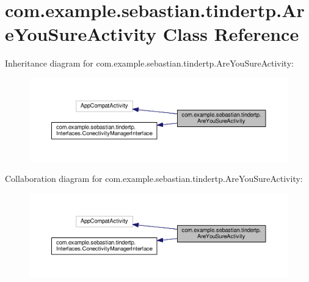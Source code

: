 \hypertarget{classcom_1_1example_1_1sebastian_1_1tindertp_1_1AreYouSureActivity}{}\section{com.\+example.\+sebastian.\+tindertp.\+Are\+You\+Sure\+Activity Class Reference}
\label{classcom_1_1example_1_1sebastian_1_1tindertp_1_1AreYouSureActivity}


Inheritance diagram for com.\+example.\+sebastian.\+tindertp.\+Are\+You\+Sure\+Activity\+:
\nopagebreak
\begin{figure}[H]
\begin{center}
\leavevmode
\includegraphics[width=350pt]{classcom_1_1example_1_1sebastian_1_1tindertp_1_1AreYouSureActivity__inherit__graph}
\end{center}
\end{figure}


Collaboration diagram for com.\+example.\+sebastian.\+tindertp.\+Are\+You\+Sure\+Activity\+:
\nopagebreak
\begin{figure}[H]
\begin{center}
\leavevmode
\includegraphics[width=350pt]{classcom_1_1example_1_1sebastian_1_1tindertp_1_1AreYouSureActivity__coll__graph}
\end{center}
\end{figure}
